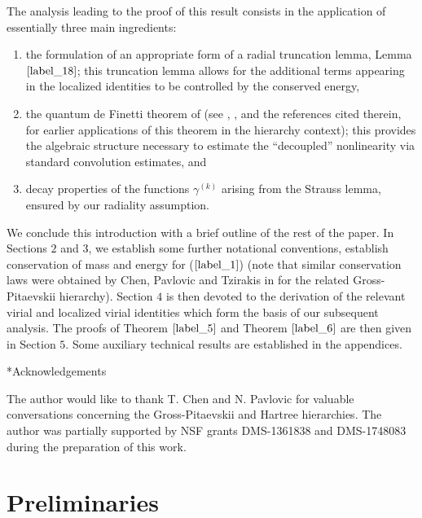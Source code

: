 \documentclass[reqno]{amsart}
\makeatletter
\numberwithin{equation}{section}
\def\subsection{\@startsection{subsection}{2}
  \z@{0.0\linespacing}{-.5em}
  {\normalfont\bfseries}}
\theoremstyle{remark}
\makeatother
\begin{document}
The analysis leading to the proof of this result consists in the application of essentially three main ingredients:
\begin{enumerate}
\item the formulation of an appropriate form of a radial truncation lemma, Lemma $\ref{label_18}$; this truncation lemma allows for the additional terms appearing in the localized identities to be controlled by the conserved energy,
\item the quantum de Finetti theorem of \cite{HM} (see \cite{LNR}, \cite{CHPS,CHPS2}, and the references cited therein, for earlier applications of this theorem in the hierarchy context); this provides the algebraic structure necessary to estimate the ``decoupled'' nonlinearity via standard convolution estimates, and
\item decay properties of the functions $\gamma^{(k)}$ arising from the Strauss lemma, ensured by our radiality assumption.
\end{enumerate}

\hspace{0.2in}

We conclude this introduction with a brief outline of the rest of the paper.  In Sections $2$ and $3$, we establish some further notational conventions, establish conservation of mass and energy for ($\ref{label_1}$) (note that similar conservation laws were obtained by Chen, Pavlovic and Tzirakis in \cite{CPT} for the related Gross-Pitaevskii hierarchy).  Section $4$ is then devoted to the derivation of the relevant virial and localized virial identities which form the basis of our subsequent analysis.  The proofs of Theorem $\ref{label_5}$ and Theorem $\ref{label_6}$ are then given in Section $5$.  Some auxiliary technical results are established in the appendices.

\vspace{0.2in}

\subsection*{Acknowledgements}

The author would like to thank T. Chen and N. Pavlovic for valuable conversations concerning the Gross-Pitaevskii and Hartree hierarchies.  The author was partially supported by NSF grants DMS-1361838 and DMS-1748083 during the preparation of this work.

\section{Preliminaries}
\end{document}
